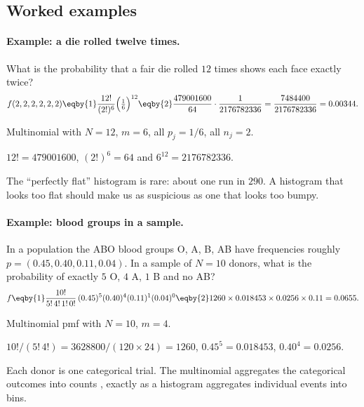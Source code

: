 \subsection{Worked examples}

\paragraph{Example: a die rolled twelve times.}
What is the probability that a fair die rolled $12$ times shows each face exactly twice?
\begin{align*}
  f(2,2,2,2,2,2) \eqby{1} \frac{12!}{(2!)^6}\Bigl(\tfrac16\Bigr)^{12}
  \eqby{2} \frac{479001600}{64}\cdot\frac{1}{2176782336}
  = \frac{7484400}{2176782336} = 0.00344 .
\end{align*}
\begin{explain}
  \item Multinomial with $N=12$, $m=6$, all $p_j=1/6$, all $n_j=2$.
  \item $12!=479001600$, $(2!)^6=64$ and $6^{12}=2176782336$.
\end{explain}
The ``perfectly flat'' histogram is rare: about one run in $290$. A histogram that looks too flat should make us as suspicious as one that looks too bumpy.

\paragraph{Example: blood groups in a sample.}
In a population the ABO blood groups O, A, B, AB have frequencies roughly $p=(0.45,0.40,0.11,0.04)$. In a sample of $N=10$ donors, what is the probability of exactly $5$ O, $4$ A, $1$ B and no AB?
\begin{align*}
  f \eqby{1} \frac{10!}{5!\,4!\,1!\,0!}\,(0.45)^5(0.40)^4(0.11)^1(0.04)^0
  \eqby{2} 1260\times0.018453\times0.0256\times0.11 = 0.0655 .
\end{align*}
\begin{explain}
  \item Multinomial pmf with $N=10$, $m=4$.
  \item $10!/(5!\,4!)=3628800/(120\times24)=1260$, $0.45^5=0.018453$, $0.40^4=0.0256$.
\end{explain}
Each donor is one categorical trial. The multinomial aggregates the categorical outcomes into counts , exactly as a histogram aggregates individual events into bins.

